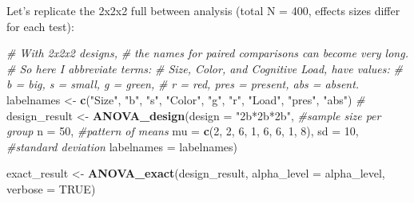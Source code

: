 \documentclass[]{book}
\newenvironment{Shaded}{\begin{snugshade}}{\end{snugshade}}
\newcommand{\CommentTok}[1]{\textcolor[rgb]{0.56,0.35,0.01}{\textit{#1}}}
\newcommand{\DataTypeTok}[1]{\textcolor[rgb]{0.13,0.29,0.53}{#1}}
\newcommand{\DecValTok}[1]{\textcolor[rgb]{0.00,0.00,0.81}{#1}}
\newcommand{\KeywordTok}[1]{\textcolor[rgb]{0.13,0.29,0.53}{\textbf{#1}}}
\newcommand{\NormalTok}[1]{#1}
\newcommand{\OtherTok}[1]{\textcolor[rgb]{0.56,0.35,0.01}{#1}}
\newcommand{\StringTok}[1]{\textcolor[rgb]{0.31,0.60,0.02}{#1}}
\begin{document}
Let's replicate the 2x2x2 full between analysis (total N = 400, effects sizes differ for each test):

\begin{Shaded}
\begin{Highlighting}[]
\CommentTok{# With 2x2x2 designs,}
\CommentTok{# the names for paired comparisons can become very long.}
\CommentTok{# So here I abbreviate terms:}
\CommentTok{# Size, Color, and Cognitive Load, have values:}
\CommentTok{# b = big, s = small, g = green,}
\CommentTok{# r = red, pres = present, abs = absent.}
\NormalTok{labelnames <-}\StringTok{ }\KeywordTok{c}\NormalTok{(}\StringTok{"Size"}\NormalTok{, }\StringTok{"b"}\NormalTok{, }\StringTok{"s"}\NormalTok{, }\StringTok{"Color"}\NormalTok{, }\StringTok{"g"}\NormalTok{, }\StringTok{"r"}\NormalTok{,}
                \StringTok{"Load"}\NormalTok{, }\StringTok{"pres"}\NormalTok{, }\StringTok{"abs"}\NormalTok{) }\CommentTok{#}
\NormalTok{design_result <-}\StringTok{ }\KeywordTok{ANOVA_design}\NormalTok{(}\DataTypeTok{design =} \StringTok{"2b*2b*2b"}\NormalTok{,}
                              \CommentTok{#sample size per group}
                              \DataTypeTok{n =} \DecValTok{50}\NormalTok{,}
                              \CommentTok{#pattern of means}
                              \DataTypeTok{mu =} \KeywordTok{c}\NormalTok{(}\DecValTok{2}\NormalTok{, }\DecValTok{2}\NormalTok{, }\DecValTok{6}\NormalTok{, }\DecValTok{1}\NormalTok{, }\DecValTok{6}\NormalTok{, }\DecValTok{6}\NormalTok{, }\DecValTok{1}\NormalTok{, }\DecValTok{8}\NormalTok{),}
                              \DataTypeTok{sd =} \DecValTok{10}\NormalTok{, }\CommentTok{#standard deviation}
                              \DataTypeTok{labelnames =}\NormalTok{ labelnames)}

\NormalTok{exact_result <-}\StringTok{ }\KeywordTok{ANOVA_exact}\NormalTok{(design_result,}
                            \DataTypeTok{alpha_level =}\NormalTok{ alpha_level,}
                            \DataTypeTok{verbose =} \OtherTok{TRUE}\NormalTok{)}
\end{Highlighting}
\end{Shaded}
\end{document}

